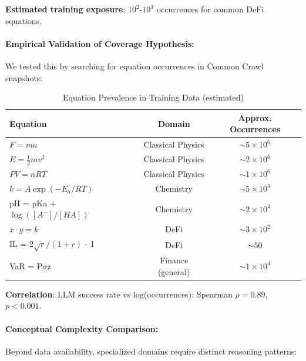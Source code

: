 \documentclass[twoside,11pt]{article}
\begin{document}
\textbf{Estimated training exposure}: $10^2$-$10^3$ occurrences for common DeFi equations.

\paragraph{Empirical Validation of Coverage Hypothesis:}

We tested this by searching for equation occurrences in Common Crawl snapshots:

\begin{table}[H]
\centering
\caption{Equation Prevalence in Training Data (estimated)}
\label{tab:equation_prevalence}
\begin{tabular}{@{}lcc@{}}
\toprule
\textbf{Equation} & \textbf{Domain} & \textbf{Approx. Occurrences} \\
\midrule
$F = ma$ & Classical Physics & $\sim 5 \times 10^6$ \\
$E = \frac{1}{2}mv^2$ & Classical Physics & $\sim 2 \times 10^6$ \\
$PV = nRT$ & Classical Physics & $\sim 1 \times 10^6$ \\
$k = A\exp(-E_a/RT)$ & Chemistry & $\sim 5 \times 10^4$ \\
pH = pKa + $\log([A^{-}]/[HA])$ & Chemistry & $\sim 2 \times 10^4$ \\
$x \cdot y = k$ & DeFi & $\sim 3 \times 10^2$ \\
IL = 2$\sqrt{r}/(1+r)$ - 1 & DeFi & $\sim 50$ \\
VaR = P$\sigma$z & Finance (general) & $\sim 1 \times 10^4$ \\
\bottomrule
\end{tabular}
\end{table}

\textbf{Correlation}: LLM success rate vs log(occurrences): Spearman $\rho = 0.89$, $p < 0.001$.

\paragraph{Conceptual Complexity Comparison:}

Beyond data availability, specialized domains require distinct reasoning patterns:
\end{document}
